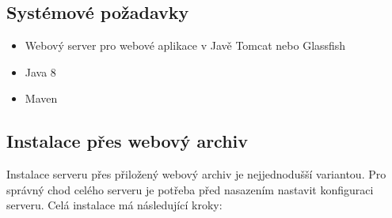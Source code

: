 \documentclass[thesis=B,czech]{FITthesis}[2012/06/26]
\begin{document}
  \subsection{Systémové požadavky}
  \begin{itemize}
   \item Webový server pro webové aplikace v Javě Tomcat \cite{tomcat_web} nebo Glassfish \cite{glassfish}
   \item Java 8 \cite{java8}
   \item Maven \cite{maven}
  \end{itemize}
    
  \subsection{Instalace přes webový archiv}\label{war_install}
  Instalace serveru přes přiložený webový archiv je nejjednodušší variantou. Pro správný chod celého serveru je potřeba před nasazením nastavit konfiguraci serveru.
  Celá instalace má následující kroky:
\end{document}
